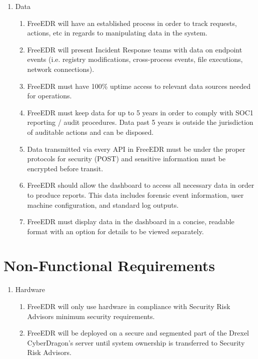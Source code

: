 \documentclass{scrreprt}
\begin{document}
\begin{enumerate}[label*=R\arabic*.]
    \item Data
    \begin{enumerate}[label*=\arabic*.]
\item FreeEDR will have an established process in order to track requests, actions, etc in regards to manipulating data in the system.
\item FreeEDR will present Incident Response teams with data on endpoint events (i.e. registry modifications, cross-process events, file executions, network connections).
\item FreeEDR must have 100\% uptime access to relevant data sources needed for operations. 
\item FreeEDR must keep data for up to 5 years in order to comply with SOC1 reporting / audit procedures. Data past 5 years is outside the jurisdiction of auditable actions and can be disposed.
\item Data transmitted via every API in FreeEDR must be under the proper protocols for security (POST) and sensitive information must be encrypted before transit.
\item FreeEDR should allow the dashboard to access all necessary data in order to produce reports. This data includes forensic event information, user machine configuration, and standard log outputs.\
\item FreeEDR must display data in the dashboard in a concise, readable format with an option for details to be viewed separately. 
\end{enumerate}
\end{enumerate}


\section{Non-Functional Requirements}

\begin{enumerate}[label*=N\arabic*.]
    \item Hardware
    \begin{enumerate}[label*=\arabic*.]
\item FreeEDR will only use hardware in compliance with Security Risk Advisors minimum security requirements. 
\item FreeEDR will be deployed on a secure and segmented part of the Drexel CyberDragon’s server until system ownership is transferred to Security Risk Advisors.
    \end{enumerate}
\end{enumerate}
\end{document}
